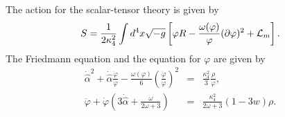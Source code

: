\documentclass[a4paper,11pt]{article}
\begin{document}
The action for the scalar-tensor theory is given by 
\begin{equation}
S = \frac{1}{2\kappa_4^2}
\int d^4 x \sqrt{-g}
\left[
\varphi R -\frac{\omega(\varphi)}{\varphi}
         (\partial \varphi)^2 + {\cal L}_m
\right]. 
\label{eq:ST_action}
\end{equation}
The Friedmann equation and the equation for $\varphi$ are given by
\begin{eqnarray}
\dot{\hat{\alpha}}^2+\dot{\hat{\alpha}} \frac{\dot{\varphi}}{\varphi}
-\frac{\omega(\varphi)}{6} \left(\frac{\dot{\varphi}}{\varphi}
\right)^2 
&=& \frac{\kappa_4^2}{3} \frac{\rho}{\varphi}, \nonumber\\
\ddot{\varphi}+\dot{\varphi} \left(3 \dot{\hat{\alpha}}+ 
\frac{\dot{\omega}}{2 \omega+3} \right)
&=& \frac{\kappa_4^2}{2 \omega+3}
(1-3w) \rho.
\label{eq:BDfriedmann}
\end{eqnarray}
\end{document}
